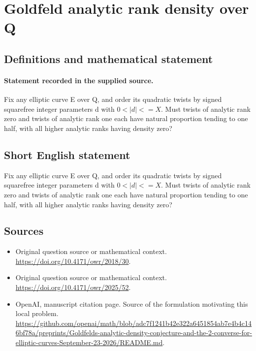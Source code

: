 \documentclass[11pt]{article}
\begin{document}
\section*{Goldfeld analytic rank density over Q}\label{30007264}
\subsection{Definitions and mathematical statement}
\paragraph{Statement recorded in the supplied source.}
Fix any elliptic curve E over Q, and order its quadratic twists by signed squarefree integer parameters d with $0<|d|<=X$. Must twists of analytic rank zero and twists of analytic rank one each have natural proportion tending to one half, with all higher analytic ranks having density zero?
\subsection{Short English statement}
Fix any elliptic curve E over Q, and order its quadratic twists by signed squarefree integer parameters d with $0<|d|<=X$. Must twists of analytic rank zero and twists of analytic rank one each have natural proportion tending to one half, with all higher analytic ranks having density zero?
\subsection{Sources}
\begin{itemize}
\item[S1] Original question source or mathematical context.
\url{https://doi.org/10.4171/owr/2018/30}.
\item[S2] Original question source or mathematical context.
\url{https://doi.org/10.4171/owr/2025/52}.
\item[S3] OpenAI, manuscript citation page. Source of the formulation motivating this local problem.
\url{https://github.com/openai/math/blob/adc7f1241b42e322a6451854ab7e4b4c146bf78a/preprints/Goldfelds-analytic-density-conjecture-and-the-2-converse-for-elliptic-curves-September-23-2026/README.md}.
\end{itemize}
\end{document}
